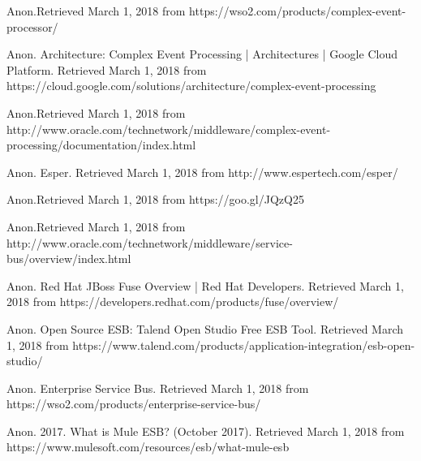 \documentclass[a4paper]{article}
\begin{document}
\begin{thebibliography}{9}
Anon.Retrieved March 1, 2018 from https://wso2.com/products/complex-event-processor/ 

Anon. Architecture: Complex Event Processing  |  Architectures  |  Google Cloud Platform. Retrieved March 1, 2018 from https://cloud.google.com/solutions/architecture/complex-event-processing

Anon.Retrieved March 1, 2018 from http://www.oracle.com/technetwork/middleware/complex-event-processing/documentation/index.html

Anon. Esper. Retrieved March 1, 2018 from http://www.espertech.com/esper/ 

Anon.Retrieved March 1, 2018 from https://goo.gl/JQzQ25

Anon.Retrieved March 1, 2018 from http://www.oracle.com/technetwork/middleware/service-bus/overview/index.html 

Anon. Red Hat JBoss Fuse Overview | Red Hat Developers. Retrieved March 1, 2018 from https://developers.redhat.com/products/fuse/overview/ 

Anon. Open Source ESB: Talend Open Studio Free ESB Tool. Retrieved March 1, 2018 from https://www.talend.com/products/application-integration/esb-open-studio/ 

Anon. Enterprise Service Bus. Retrieved March 1, 2018 from https://wso2.com/products/enterprise-service-bus/

Anon. 2017. What is Mule ESB? (October 2017). Retrieved March 1, 2018 from https://www.mulesoft.com/resources/esb/what-mule-esb


\end{thebibliography}

\bigskip

\clearpage\clearpage\pagestyle{plain}
\thispagestyle{FirstPage}


\bigskip
\end{document}
